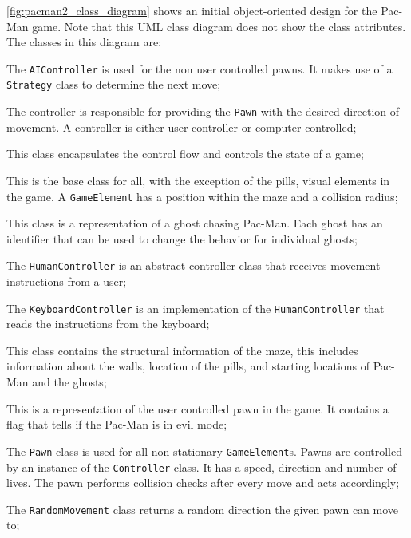 %
\autoref{fig:pacman2_class_diagram} shows an initial object-oriented design for the Pac-Man game.
Note that this UML class diagram does not show the class attributes.
The classes in this diagram are:
\begin{description}[noitemsep,style=sameline,leftmargin=32mm]
	\item[AIController] The \lstinline|AIController| is used for the non user controlled pawns. It makes 
		use of a \lstinline|Strategy| class	to determine the next move;
	\item[Controller] The controller is responsible for providing the \lstinline|Pawn| with the desired 
		direction of movement. A controller is either user controller or computer controlled;
	\item[Game] This class encapsulates the control flow and controls the state of a game;
	\item[GameElement] This is the base class for all, with the exception of the pills, visual elements 
		in the game. A \lstinline|GameElement| has a position within the maze and a collision radius;
	\item[Ghost] This class is a representation of a ghost chasing Pac-Man. Each ghost has an identifier that can be
		used to change the behavior for individual ghosts;	
	\item[HumanController] The \lstinline|HumanController| is an abstract controller class that receives movement 
		instructions from a user;
	\item[KeyboardController] The \lstinline|KeyboardController| is an implementation of the \lstinline|HumanController|
	  that reads the instructions from the keyboard;			
	\item[Level] This class contains the structural information of the maze, this includes information about the walls,
		location of the pills, and starting locations of Pac-Man and the ghosts;
	\item[Pacman] This is a representation of the user controlled pawn in the game. It contains a flag that tells if
		the Pac-Man is in evil mode;	
	\item[Pawn] The \lstinline|Pawn| class is used for all non stationary \lstinline|GameElement|s. Pawns are 
		controlled by an instance of the \lstinline|Controller| class. It has a speed, direction and number of lives.
		The pawn performs collision checks after every move and acts accordingly;
	\item[RandomMovement] The \lstinline|RandomMovement| class returns a random direction the given pawn can move to;

\end{description}
